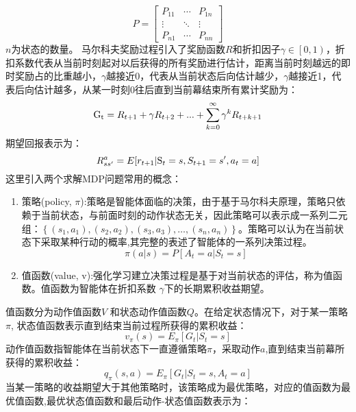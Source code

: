 \begin{equation}
P = \left[ {\begin{array}{*{20}{c}}
	{{P_{11}}}& \cdots &{{P_{1n}}}\\
	\vdots & \ddots & \vdots \\
	{{P_{n1}}}& \cdots &{{P_{nn}}}
	\end{array}} \right]
\end{equation}
$n$为状态的数量。
马尔科夫奖励过程引入了奖励函数$R$和折扣因子$\gamma  \in \left[ {0,1} \right)$，折扣系数代表从当前时刻起对以后获得的所有奖励进行估计，距离当前时刻越远的即时奖励占的比重越小，$\gamma$越接近0，代表从当前状态后向估计越少，$\gamma$越接近1，代表后向估计越多，从某一时刻$0$往后直到当前幕结束所有累计奖励为：
\begin{equation}
\label{eq:resthm}
{{\rm{G}}_{\rm{t}}} = {R_{t + 1}} + \gamma {R_{t + 2}} + ... + \sum\limits_{k = 0}^\infty  {{\gamma ^k}{R_{t + k + 1}}} 
\end{equation}
期望回报表示为：
\begin{equation}
\label{eq:e}
R_{ss'}^a = E[{r_{t{\rm{ + }}1}}{\rm{|}}{{\rm{S}}_t} = s,{S_{t + 1}} = s',{a_t} = a]
\end{equation}
这里引入两个求解MDP问题常用的概念：
\begin{enumerate}
	\item 策略(policy, $ \pi $):策略是智能体面临的决策，由于基于马尔科夫原理，策略只依赖于当前状态，与前面时刻的动作状态无关，因此策略可以表示成一系列二元组：$\left \{ \left ( s_{1},a_{1} \right ),\left ( s_{2},a_{2}\right ),\left ( s_{3},a_{3}\right ),\dots,\left ( s_{n},a_{n}\right )\right \}$。策略可以认为在当前状态下采取某种行动的概率,其完整的表述了智能体的一系列决策过程。
\begin{equation}
\label{eq:3}
\pi (a|s) = P[{A_t} = a|{S_t} = s]
\end{equation}
	\item 值函数(value, v):强化学习建立决策过程是基于对当前状态的评估，称为值函数。值函数为智能体在折扣系数 $\gamma$下的长期累积收益期望。
\end{enumerate}

值函数分为动作值函数$V$ 和状态动作值函数$Q$。在给定状态情况下，对于某一策略 $\pi$, 状态值函数表示直到结束当前过程所获得的累积收益：
\begin{equation}
\label{eq:4}
{v_\pi }(s) = {E_\pi }[{G_t}|{S_t} = s]
\end{equation}
动作值函数指智能体在当前状态下一直遵循策略$ \pi $，采取动作$a$,直到结束当前幕所获得的累积收益：
\begin{equation}
\label{eq:5}
{q_\pi }(s,a) = {E_\pi }[{G_t}|{S_t} = s,{A_t} = a]
\end{equation}
当某一策略的收益期望大于其他策略时，该策略成为最优策略，对应的值函数为最优值函数,最优状态值函数和最后动作-状态值函数表示为：


